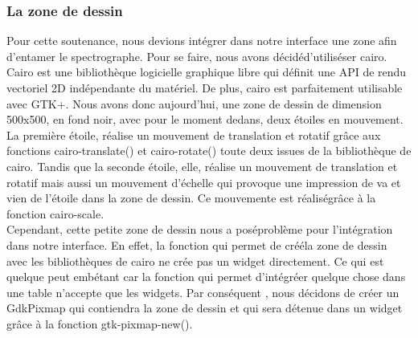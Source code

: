 \documentclass[a4paper,12pt]{article}
\begin{document}
	\subsubsection{La zone de dessin}
Pour cette soutenance, nous devions int\'egrer dans notre interface une zone afin
d'entamer le spectrographe. Pour se faire, nous avons d\'ecid\'ed'utilis\'eser cairo.
Cairo est une biblioth\`eque logicielle graphique libre qui d\'efinit une API de
rendu vectoriel 2D ind\'ependante du mat\'eriel. De plus, cairo est parfaitement
utilisable avec GTK+. Nous avons donc aujourd'hui, une zone de dessin de
dimension 500x500, en fond noir, avec pour le moment dedans, deux \'etoiles en
mouvement. La premi\`ere \'etoile, r\'ealise un mouvement de translation et rotatif 
grâce aux fonctions cairo-translate() et cairo-rotate() toute deux issues de la
biblioth\`eque de cairo. Tandis que la seconde \'etoile, elle, r\'ealise un
mouvement de translation et rotatif mais aussi un mouvement d'\'echelle qui
provoque une impression de va et vien de l'\'etoile dans la zone de dessin. Ce
mouvemente est r\'ealis\'egrâce à la fonction cairo-scale.\\
Cependant, cette petite zone de dessin nous a pos\'eprobl\`eme pour l'int\'egration dans
notre interface. En effet, la fonction qui permet de cr\'e\'ela zone de dessin avec
les biblioth\`eques de cairo ne cr\'ee pas un widget directement. Ce qui est quelque
peut emb\'etant car la fonction qui permet d'int\'egr\'eer quelque chose dans une table
n'accepte que les widgets. Par cons\'equent , nous d\'ecidons de cr\'eer un GdkPixmap
qui contiendra la zone de dessin et qui sera d\'etenue dans un widget grâce à la
fonction gtk-pixmap-new().  
\end{document}
